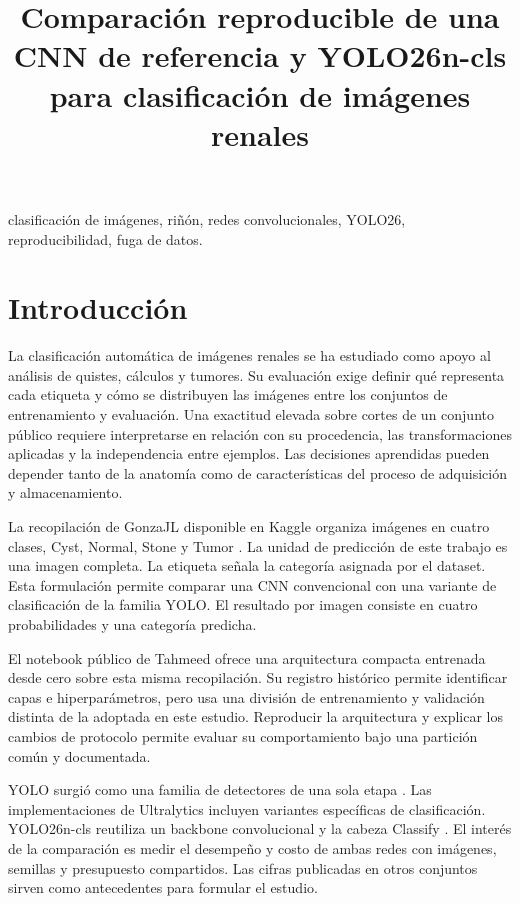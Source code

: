\documentclass[conference]{IEEEtran}
\title{Comparación reproducible de una CNN de referencia y YOLO26n-cls para clasificación de imágenes renales}
\author{\IEEEauthorblockN{Juan Fernando Jaimes Pérez, Miguel Andrés Veloza\\y Gabriela Contreras García}
\IEEEauthorblockA{Programa de Ingeniería de Sistemas\\Universidad Simón Bolívar, sede Cúcuta\\Cúcuta, Colombia}}
\begin{document}
\maketitle

\begin{IEEEkeywords}
clasificación de imágenes, riñón, redes convolucionales, YOLO26, reproducibilidad, fuga de datos.
\end{IEEEkeywords}
\section{Introducción}
La clasificación automática de imágenes renales se ha estudiado como apoyo al análisis de quistes, cálculos y tumores. Su evaluación exige definir qué representa cada etiqueta y cómo se distribuyen las imágenes entre los conjuntos de entrenamiento y evaluación. Una exactitud elevada sobre cortes de un conjunto público requiere interpretarse en relación con su procedencia, las transformaciones aplicadas y la independencia entre ejemplos. Las decisiones aprendidas pueden depender tanto de la anatomía como de características del proceso de adquisición y almacenamiento.

La recopilación de GonzaJL disponible en Kaggle organiza imágenes en cuatro clases, Cyst, Normal, Stone y Tumor \cite{dataset}. La unidad de predicción de este trabajo es una imagen completa. La etiqueta señala la categoría asignada por el dataset. Esta formulación permite comparar una CNN convencional con una variante de clasificación de la familia YOLO. El resultado por imagen consiste en cuatro probabilidades y una categoría predicha.

El notebook público de Tahmeed \cite{baseline} ofrece una arquitectura compacta entrenada desde cero sobre esta misma recopilación. Su registro histórico permite identificar capas e hiperparámetros, pero usa una división de entrenamiento y validación distinta de la adoptada en este estudio. Reproducir la arquitectura y explicar los cambios de protocolo permite evaluar su comportamiento bajo una partición común y documentada.

YOLO surgió como una familia de detectores de una sola etapa \cite{yolo}. Las implementaciones de Ultralytics incluyen variantes específicas de clasificación. YOLO26n-cls reutiliza un backbone convolucional y la cabeza Classify \cite{yolo26,ultralytics}. El interés de la comparación es medir el desempeño y costo de ambas redes con imágenes, semillas y presupuesto compartidos. Las cifras publicadas en otros conjuntos sirven como antecedentes para formular el estudio.
\end{document}
